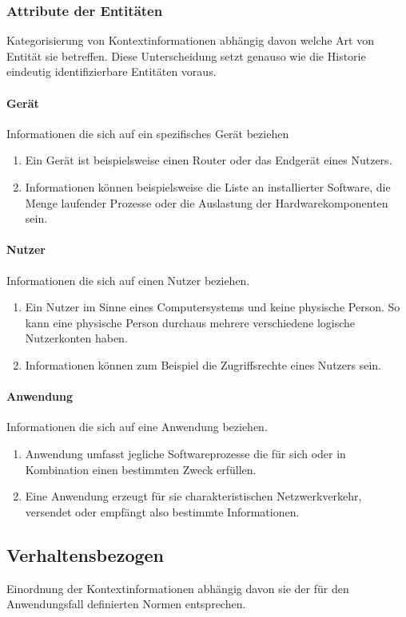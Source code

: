\subsubsection{Attribute der Entitäten}
Kategorisierung von Kontextinformationen abhängig davon welche Art von Entität sie betreffen.
Diese Unterscheidung setzt genauso wie die Historie eindeutig identifizierbare Entitäten voraus.
\paragraph{Gerät}
Informationen die sich auf ein spezifisches Gerät beziehen
\begin{enumerate}
\item{Ein Gerät ist beispielsweise einen Router oder das Endgerät eines Nutzers. }
\item{Informationen können beispielsweise die Liste an installierter Software, die Menge laufender Prozesse oder die Auslastung der Hardwarekomponenten sein.}
\end{enumerate}
\paragraph{Nutzer}
Informationen die sich auf einen Nutzer beziehen.
\begin{enumerate}
\item{Ein Nutzer im Sinne eines Computersystems und keine physische Person. So kann eine physische Person durchaus mehrere verschiedene logische Nutzerkonten haben. }
\item{Informationen können zum Beispiel die Zugriffsrechte eines Nutzers sein.}
\end{enumerate}
\paragraph{Anwendung}
Informationen die sich auf eine Anwendung beziehen.
\begin{enumerate}
\item{Anwendung umfasst jegliche Softwareprozesse die für sich oder in Kombination einen bestimmten Zweck erfüllen.}
\item{Eine Anwendung erzeugt für sie charakteristischen Netzwerkverkehr, versendet oder empfängt also bestimmte Informationen.}
\end{enumerate}
\subsection{Verhaltensbezogen}
Einordnung der Kontextinformationen abhängig davon sie der für den Anwendungsfall definierten Normen entsprechen.
